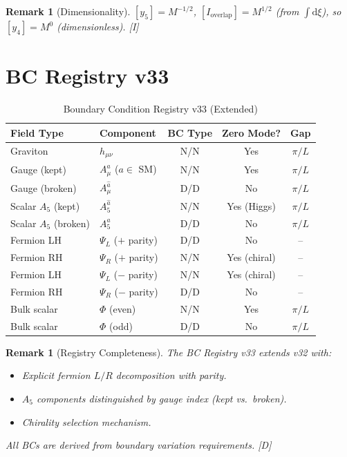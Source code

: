 \documentclass[11pt,a4paper]{article}
\newtheorem{remark}[theorem]{Remark}
\newcommand{\dd}{\mathrm{d}}
\begin{document}
\begin{remark}[Dimensionality]
$[y_5] = M^{-1/2}$, $[I_{\text{overlap}}] = M^{1/2}$ (from $\int \dd\xi$), so $[y_4] = M^0$ (dimensionless). [I]
\end{remark}

\section{BC Registry v33}
\label{sec:bc-registry}

\begin{table}[h]
\centering
\caption{Boundary Condition Registry v33 (Extended)}
\label{tab:bc-registry}
\begin{tabular}{llccc}
\toprule
Field Type & Component & BC Type & Zero Mode? & Gap \\
\midrule
Graviton & $h_{\mu\nu}$ & N/N & Yes & $\pi/L$ \\
Gauge (kept) & $A_\mu^a$ ($a \in$ SM) & N/N & Yes & $\pi/L$ \\
Gauge (broken) & $A_\mu^{\hat{a}}$ & D/D & No & $\pi/L$ \\
Scalar $A_5$ (kept) & $A_5^{\hat{a}}$ & N/N & Yes (Higgs) & $\pi/L$ \\
Scalar $A_5$ (broken) & $A_5^a$ & D/D & No & $\pi/L$ \\
Fermion LH & $\Psi_L$ ($+$ parity) & D/D & No & -- \\
Fermion RH & $\Psi_R$ ($+$ parity) & N/N & Yes (chiral) & -- \\
Fermion LH & $\Psi_L$ ($-$ parity) & N/N & Yes (chiral) & -- \\
Fermion RH & $\Psi_R$ ($-$ parity) & D/D & No & -- \\
Bulk scalar & $\Phi$ (even) & N/N & Yes & $\pi/L$ \\
Bulk scalar & $\Phi$ (odd) & D/D & No & $\pi/L$ \\
\bottomrule
\end{tabular}
\end{table}

\begin{remark}[Registry Completeness]
The BC Registry v33 extends v32 with:
\begin{itemize}
\item Explicit fermion $L/R$ decomposition with parity.
\item $A_5$ components distinguished by gauge index (kept vs.\ broken).
\item Chirality selection mechanism.
\end{itemize}
All BCs are derived from boundary variation requirements. [D]
\end{remark}
\end{document}

